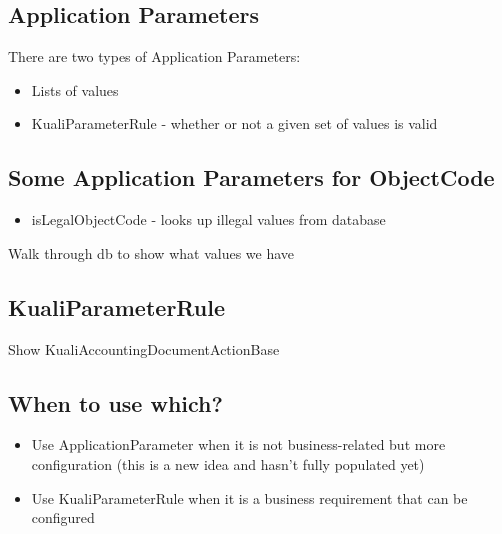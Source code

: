 \begin{ifhtml}
    \begin{s5slide}
        \section{Application Parameters}
            There are two types of Application Parameters:
            \begin{itemize}
                \item Lists of values 
                \item KualiParameterRule - whether or not a given set of values is valid
            \end{itemize}
    \end{s5slide}
    \begin{s5slide}
        \section{Some Application Parameters for ObjectCode}
            \begin{itemize}
                \item isLegalObjectCode - looks up illegal values from database
            \end{itemize}
            \begin{s5notes}
                Walk through db to show what values we have
            \end{s5notes}
    \end{s5slide}
    \begin{s5slide}
        \section{KualiParameterRule}
            
        \begin{s5notes}
            Show KualiAccountingDocumentActionBase
        \end{s5notes}
    \end{s5slide}
    \begin{s5slide}
        \section{When to use which?}
            \begin{itemize}
                \item Use ApplicationParameter when it is not business-related but more configuration (this is a new idea and hasn't fully populated yet)
                \item Use KualiParameterRule when it is a business requirement that can be configured
            \end{itemize}
    \end{s5slide}
    \begin{s5slide}

\end{s5slide}
\end{ifhtml}
